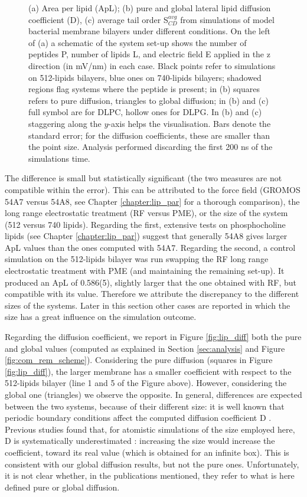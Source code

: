 \begin{figure}
\caption[ApL, D and S$_{CD}$ for atomistic membrane simulations]{(a) Area per lipid (ApL); (b) pure and global lateral lipid diffusion coefficient (D), (c) average tail order S$^{avg}_{CD}$ from simulations of model bacterial membrane bilayers under different conditions. On the left of (a) a schematic of the system set-up shows the number of peptides P, number of lipids L, and electric field E applied in the z direction (in mV/nm) in each case. 
%
Black points refer to simulations on 512-lipids bilayers, blue ones on 740-lipids bilayers; shadowed regions flag systems where the peptide is present; in (b) squares refers to pure diffusion, triangles to global diffusion; in (b) and (c) full symbol are for DLPC, hollow ones for DLPG.
In (b) and (c) staggering along the $y$-axis helps the visualisation.
%
Bars denote the standard error; for the diffusion coefficients, these are smaller than the point size. Analysis performed discarding the first 200 ns of the simulations time.}
\label{fig:lipids_ApL_D}
\end{figure}

The difference is small but statistically significant (the two measures are not compatible within the error).
%
This can be attributed to the force field (GROMOS 54A7 versus 54A8, see Chapter \ref{chapter:lip_par} for a thorough comparison), the long range electrostatic treatment (RF versus PME), or the size of the system (512 versus 740 lipids). %
%
Regarding the first, extensive tests on phosphocholine lipids (see Chapter \ref{chapter:lip_par}) suggest that generally 54A8 gives larger ApL values than the ones computed with 54A7.
%
Regarding the second, a control simulation on the 512-lipids bilayer was run swapping the RF long range electrostatic treatment with PME (and maintaining the remaining set-up). It produced an ApL of 0.586(5), slightly larger that the one obtained with RF, but compatible with its value.
%
Therefore we attribute the discrepancy to the different sizes of the systems. Later in this section other cases are reported in which the size has a great influence on the simulation outcome.

Regarding the diffusion coefficient, we report in Figure \ref{fig:lip_diff} both the pure and global values (computed as explained in Section \ref{sec:analysis} and Figure \ref{fig:com_rem_scheme}).
%
Considering the pure diffusion (squares in Figure \ref{fig:lip_diff}), the larger membrane has a smaller coefficient with respect to the 512-lipids bilayer (line 1 and 5 of the Figure above). However, considering the global one (triangles) we observe the opposite.
%
In general, differences are expected between the two systems, because of their different size: it is well known that periodic boundary conditions affect the computed diffusion coefficient D \citep{Camley2015,Venable2017}. Previous studies found that, for atomistic simulations of the size employed here, D is systematically underestimated \citep{Camley2015}: increasing the size would increase the coefficient, toward its real value (which is obtained for an infinite box). This is consistent with our global diffusion results, but not the pure ones. Unfortunately, it is not clear whether, in the publications mentioned, they refer to what is here defined pure or global diffusion.

